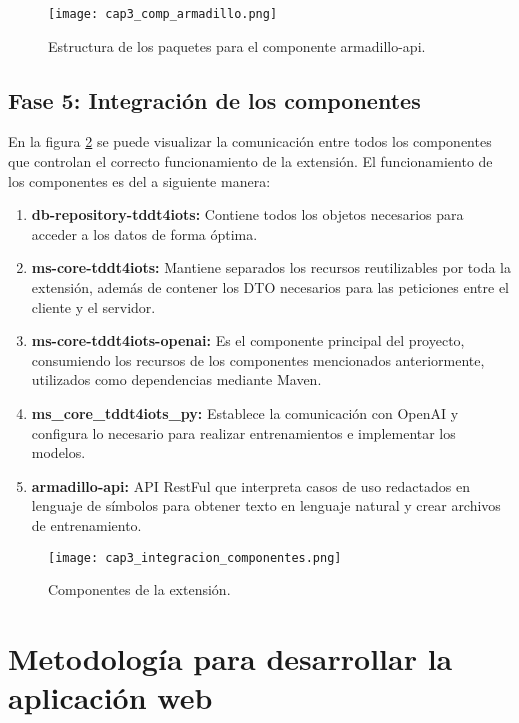 \begin{itemize}
	\begin{figure}[H]  
		\centering
		\texttt{[image: cap3\_comp\_armadillo.png]}
		\caption{Estructura de los paquetes para el componente armadillo-api.}
		\label{fig:cap3_comp_armadillo}
	\end{figure}
	
\end{itemize}

\subsection{Fase 5: Integración de los componentes}

En la figura \ref{fig:cap3_integracion_componentes} se puede visualizar la comunicación entre todos los componentes que controlan el correcto funcionamiento de la extensión. El funcionamiento de los componentes es del a siguiente manera:

\begin{enumerate}
	\item \textbf{db-repository-tddt4iots:} Contiene todos los objetos necesarios para acceder a los datos de forma óptima.
	\item \textbf{ms-core-tddt4iots:} Mantiene separados los recursos reutilizables por toda la extensión, además de contener los DTO necesarios para las peticiones entre el cliente y el servidor.
	\item \textbf{ms-core-tddt4iots-openai:} Es el componente principal del proyecto, consumiendo los recursos de los componentes mencionados anteriormente, utilizados como dependencias mediante Maven.
	\item \textbf{ms\_core\_tddt4iots\_py:} Establece la comunicación con OpenAI y configura lo necesario para realizar entrenamientos e implementar los modelos.
	\item \textbf{armadillo-api:} API RestFul que interpreta casos de uso redactados en lenguaje de símbolos para obtener texto en lenguaje natural y crear archivos de entrenamiento.
\end{enumerate}

	\begin{figure}[H]  
		\centering
		\texttt{[image: cap3\_integracion\_componentes.png]}
		\caption{Componentes de la extensión.}
		\label{fig:cap3_integracion_componentes}
	\end{figure}


\section{Metodología para desarrollar la aplicación web}

